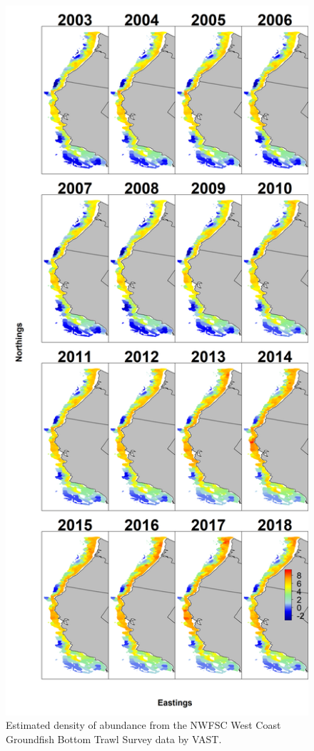 \documentclass[12pt,]{article}
\begin{document}
\begin{figure}
\centering
\includegraphics{Figures/nwfsc_dens.png}
\caption{Estimated density of abundance from the NWFSC West Coast
Groundfish Bottom Trawl Survey data by VAST. \label{fig:nw_density}}
\end{figure}
\end{document}
